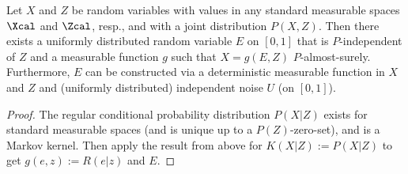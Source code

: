 \begin{Cor}    
    Let $X$ and $Z$ be random variables with values in any standard measurable spaces $\Xcal$ and $\Zcal$, resp., and with a joint distribution $P(X,Z)$.
    Then there exists a uniformly distributed random variable $E$ on $[0,1]$ that is $P$-independent of $Z$ and a measurable function $g$ such that $X = g(E,Z)$ $P$-almost-surely.
    Furthermore, $E$ can be constructed via a deterministic measurable function in $X$ and $Z$ and (uniformly distributed) independent noise $U$ (on $[0,1]$).
    \begin{proof}
        The regular conditional probability distribution $P(X|Z)$ exists for standard measurable spaces (and is unique up to a $P(Z)$-zero-set), and is a Markov kernel. Then apply the result from above for $K(X|Z):=P(X|Z)$ to get $g(e,z):=R(e|z)$ and $E$.
    \end{proof}
\end{Cor}

